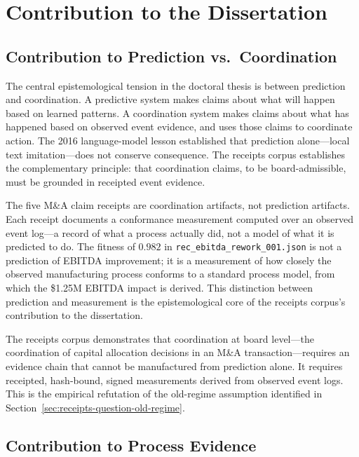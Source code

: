 \section{Contribution to the Dissertation}
\label{sec:receipts-contribution}

\subsection{Contribution to Prediction vs.~Coordination}
\label{sec:receipts-contribution-prediction}

The central epistemological tension in the doctoral thesis is between prediction and
coordination. A predictive system makes claims about what will happen based on learned
patterns. A coordination system makes claims about what has happened based on observed
event evidence, and uses those claims to coordinate action. The 2016 language-model
lesson established that prediction alone---local text imitation---does not conserve
consequence. The receipts corpus establishes the complementary principle: that
coordination claims, to be board-admissible, must be grounded in receipted event evidence.

The five M\&A claim receipts are coordination artifacts, not prediction artifacts. Each
receipt documents a conformance measurement computed over an observed event log---a
record of what a process actually did, not a model of what it is predicted to do.
The fitness of $0.982$ in \texttt{rec\_ebitda\_rework\_001.json} is not a prediction
of EBITDA improvement; it is a measurement of how closely the observed manufacturing
process conforms to a standard process model, from which the \$1.25M EBITDA impact
is derived. This distinction between prediction and measurement is the epistemological
core of the receipts corpus's contribution to the dissertation.

The receipts corpus demonstrates that coordination at board level---the coordination
of capital allocation decisions in an M\&A transaction---requires an evidence chain
that cannot be manufactured from prediction alone. It requires receipted, hash-bound,
signed measurements derived from observed event logs. This is the empirical refutation
of the old-regime assumption identified in Section~\ref{sec:receipts-question-old-regime}.

\subsection{Contribution to Process Evidence}
\label{sec:receipts-contribution-evidence}

